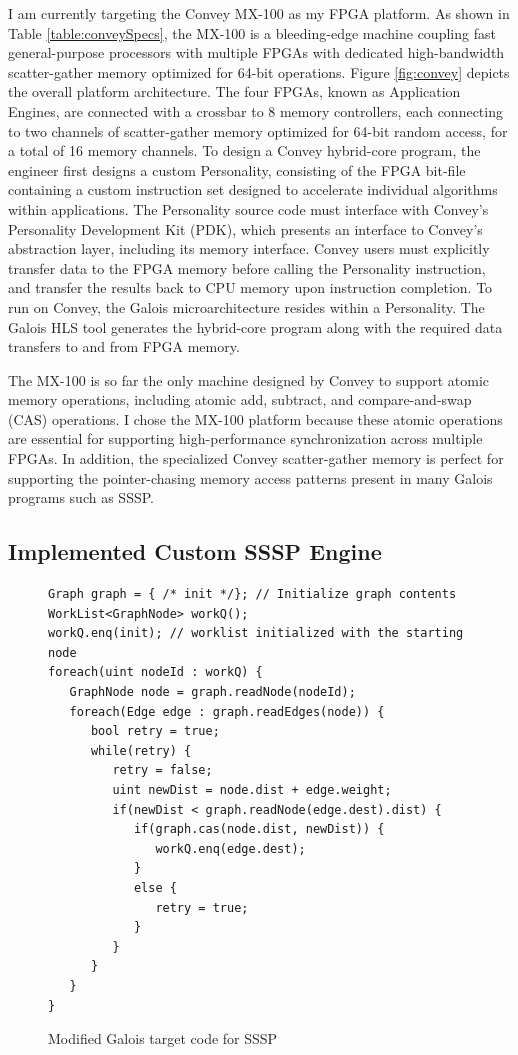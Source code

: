 I am currently targeting the Convey MX-100 as my FPGA platform. As shown in Table \ref{table:conveySpecs}, the MX-100 
is a bleeding-edge machine coupling fast general-purpose processors with multiple FPGAs with dedicated high-bandwidth 
scatter-gather memory optimized for 64-bit operations. Figure \ref{fig:convey} depicts the overall platform 
architecture. The four FPGAs, known as Application Engines, are connected with a crossbar to 8 memory controllers, 
each connecting to two channels of scatter-gather memory optimized for 64-bit random access, for a total of 16 memory 
channels. To design a Convey hybrid-core program, the engineer first designs a custom Personality, consisting of the 
FPGA bit-file containing a custom instruction set designed to accelerate individual algorithms within applications. 
The Personality source code must interface with Convey's Personality Development Kit (PDK), which presents an 
interface to Convey's abstraction layer, including its memory interface. Convey users must explicitly transfer data 
to the FPGA memory before calling the Personality instruction, and transfer the results back to CPU memory upon 
instruction completion. To run on Convey, the Galois microarchitecture resides within a Personality. The Galois HLS 
tool generates the hybrid-core program along with the required data transfers to and from FPGA memory.

The MX-100 is so far the only machine designed by Convey to support atomic memory operations, including atomic add, 
subtract, and compare-and-swap (CAS) operations. I chose the MX-100 platform because these atomic operations are 
essential for supporting high-performance synchronization across multiple FPGAs. In addition, the specialized Convey scatter-gather 
memory is perfect for supporting the pointer-chasing memory access patterns present in many Galois programs such as 
SSSP.

\subsection{Implemented Custom SSSP Engine}

\begin{figure}
\centering
\lstset{language=Java}
\begin{lstlisting}
Graph graph = { /* init */}; // Initialize graph contents
WorkList<GraphNode> workQ();
workQ.enq(init); // worklist initialized with the starting node
foreach(uint nodeId : workQ) {
   GraphNode node = graph.readNode(nodeId);
   foreach(Edge edge : graph.readEdges(node)) {
      bool retry = true;
      while(retry) {
         retry = false;
      	 uint newDist = node.dist + edge.weight;
         if(newDist < graph.readNode(edge.dest).dist) {
            if(graph.cas(node.dist, newDist)) {
               workQ.enq(edge.dest);
            }
            else {
               retry = true;
            }
         }
      }
   }
}
\end{lstlisting}
\caption{Modified Galois target code for SSSP}
\label{fig:ssspSourceCAS}
\end{figure}

